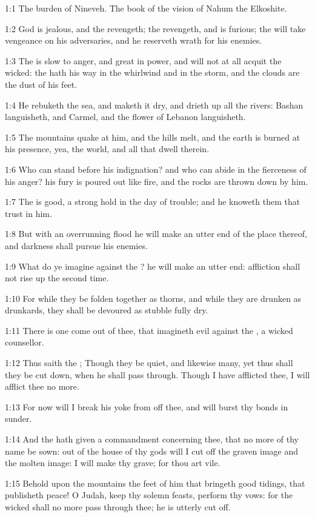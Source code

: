 

1:1 The burden of Nineveh. The book of the vision of Nahum the Elkoshite.

1:2 God is jealous, and the \LORD revengeth; the \LORD revengeth, and is furious; the \LORD will take vengeance on his adversaries, and he reserveth wrath for his enemies.

1:3 The \LORD is slow to anger, and great in power, and will not at all acquit the wicked: the \LORD hath his way in the whirlwind and in the storm, and the clouds are the dust of his feet.

1:4 He rebuketh the sea, and maketh it dry, and drieth up all the rivers: Bashan languisheth, and Carmel, and the flower of Lebanon languisheth.

1:5 The mountains quake at him, and the hills melt, and the earth is burned at his presence, yea, the world, and all that dwell therein.

1:6 Who can stand before his indignation? and who can abide in the fierceness of his anger? his fury is poured out like fire, and the rocks are thrown down by him.

1:7 The \LORD is good, a strong hold in the day of trouble; and he knoweth them that trust in him.

1:8 But with an overrunning flood he will make an utter end of the place thereof, and darkness shall pursue his enemies.

1:9 What do ye imagine against the \LORD? he will make an utter end: affliction shall not rise up the second time.

1:10 For while they be folden together as thorns, and while they are drunken as drunkards, they shall be devoured as stubble fully dry.

1:11 There is one come out of thee, that imagineth evil against the \LORD, a wicked counsellor.

1:12 Thus saith the \LORD; Though they be quiet, and likewise many, yet thus shall they be cut down, when he shall pass through. Though I have afflicted thee, I will afflict thee no more.

1:13 For now will I break his yoke from off thee, and will burst thy bonds in sunder.

1:14 And the \LORD hath given a commandment concerning thee, that no more of thy name be sown: out of the house of thy gods will I cut off the graven image and the molten image: I will make thy grave; for thou art vile.

1:15 Behold upon the mountains the feet of him that bringeth good tidings, that publisheth peace! O Judah, keep thy solemn feasts, perform thy vows: for the wicked shall no more pass through thee; he is utterly cut off.

